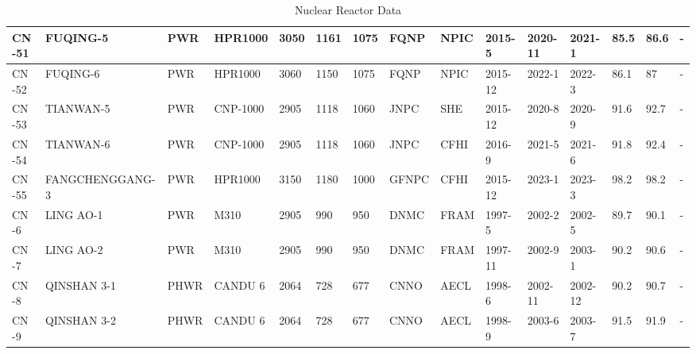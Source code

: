\begin{table}
\begin{tabular}{|l|l|l|l|l|l|l|l|l|l|l|l|l|l|}
    CN -51 & FUQING-5 & PWR & HPR1000 & 3050 & 1161 & 1075 & FQNP & NPIC & 2015-5 & 2020-11 & 2021-1 & 85.5 & 86.6 & - \\ \hline
    CN -52 & FUQING-6 & PWR & HPR1000 & 3060 & 1150 & 1075 & FQNP & NPIC & 2015-12 & 2022-1 & 2022-3 & 86.1 & 87 & - \\ \hline
    CN -53 & TIANWAN-5 & PWR & CNP-1000 & 2905 & 1118 & 1060 & JNPC & SHE & 2015-12 & 2020-8 & 2020-9 & 91.6 & 92.7 & - \\ \hline
    CN -54 & TIANWAN-6 & PWR & CNP-1000 & 2905 & 1118 & 1060 & JNPC & CFHI & 2016-9 & 2021-5 & 2021-6 & 91.8 & 92.4 & - \\ \hline
    CN -55 & FANGCHENGGANG-3 & PWR & HPR1000 & 3150 & 1180 & 1000 & GFNPC & CFHI & 2015-12 & 2023-1 & 2023-3 & 98.2 & 98.2 & - \\ \hline
    CN -6 & LING AO-1 & PWR & M310 & 2905 & 990 & 950 & DNMC & FRAM & 1997-5 & 2002-2 & 2002-5 & 89.7 & 90.1 & - \\ \hline
    CN -7 & LING AO-2 & PWR & M310 & 2905 & 990 & 950 & DNMC & FRAM & 1997-11 & 2002-9 & 2003-1 & 90.2 & 90.6 & - \\ \hline
    CN -8 & QINSHAN 3-1 & PHWR & CANDU 6 & 2064 & 728 & 677 & CNNO & AECL & 1998-6 & 2002-11 & 2002-12 & 90.2 & 90.7 & - \\ \hline
    CN -9 & QINSHAN 3-2 & PHWR & CANDU 6 & 2064 & 728 & 677 & CNNO & AECL & 1998-9 & 2003-6 & 2003-7 & 91.5 & 91.9 & - \\ \hline
    \end{tabular}
    \caption{Nuclear Reactor Data}
    \end{table}